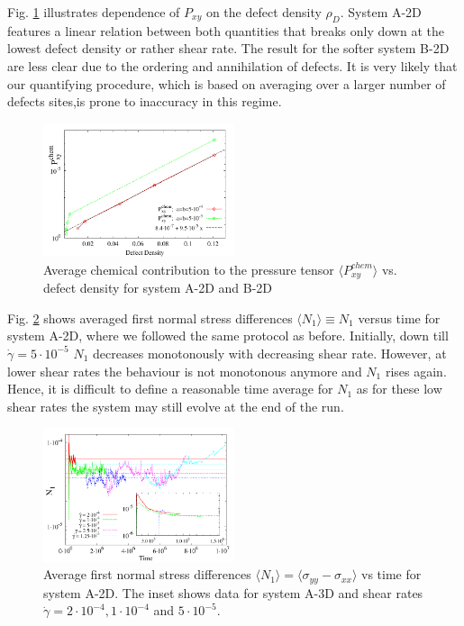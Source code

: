 \documentclass[8.5pt,twoside,twocolumn]{article}
\newcommand{\e}[1]{\cdot10^{#1}}
\newcommand{\gd}{\dot{\gamma}}
\begin{document}
Fig. \ref{fig9} illustrates dependence of $P_{xy}$ on the defect density $\rho_D$.
System A-2D features a linear relation between both quantities that breaks only down at the lowest defect density or rather shear rate.
The result for the softer system B-2D are less clear due to the ordering and annihilation of defects.
It is very likely that our quantifying procedure, which is based on averaging over a larger number of defects sites,is prone to inaccuracy in this regime.

\begin{figure}[htp!]
\centering
\includegraphics[angle=0,width=0.5\textwidth]{P_xy_defect_density.pdf}
\caption{Average chemical contribution to the pressure tensor $\langle P_{xy}^{chem}\rangle$ vs. defect density for system A-2D and B-2D } 
\label{fig9}
\end{figure}

Fig. \ref{fig10} shows averaged first normal stress differences $\langle N_1\rangle \equiv N_1$ versus time for system A-2D, where we followed the same protocol as before.
Initially, down till $\gd=5\e{-5}$ $N_1$ decreases monotonously with decreasing shear rate.
However, at lower shear rates the behaviour is not monotonous anymore and $N_1$ rises again.
Hence, it is difficult to define a reasonable time average for $N_1$ as for these low shear rates the system may still evolve at the end of the run.

\begin{figure}[htp!]
\centering
\includegraphics[angle=0,width=0.5\textwidth]{N1_t_5e-4.pdf}
\caption{Average first normal stress differences $\langle N_1 \rangle= \langle \sigma_{yy}-\sigma_{xx}\rangle$ vs time for system A-2D. The inset shows data for system A-3D and shear rates $\dot{\gamma}=2\cdot10^{-4}, 1\cdot10^{-4}$ and $5\cdot10^{-5}$.}
\label{fig10}
\end{figure}
\end{document}
